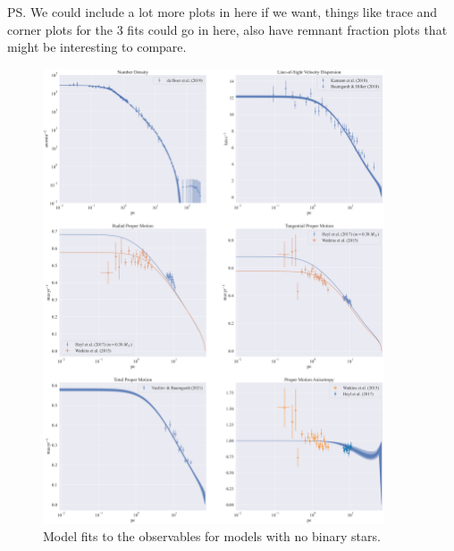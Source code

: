 \ps{We could include a lot more plots in here if we want, things like trace and corner plots for the
	3 fits could go in here, also have remnant fraction plots that might be interesting to compare.}


\begin{figure}
	\begin{center}
		\includegraphics[width=0.9\textwidth]{figures/prev_nobin/obs_panel.png}
	\end{center}
	\caption{Model fits to the observables for models with no binary stars.}
	\label{fig:nobin_obs_panel}
\end{figure}

